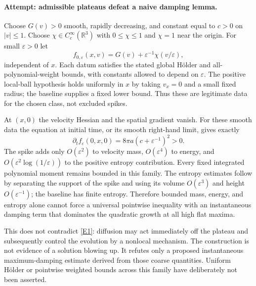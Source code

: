 \documentclass[11pt,a4paper]{article}
\newcommand{\R}{\mathbb{R}}
\newcommand{\eps}{\varepsilon}
\newcommand{\eref}[2]{\hyperlink{extra:#1:#2}{[E#2]}}
\numberwithin{equation}{section}
\begin{document}
\paragraph{Attempt: admissible plateaus defeat a naive damping lemma.}
Choose $G(v)>0$ smooth, rapidly decreasing, and constant equal to $c>0$
on $|v|\le1$. Choose $\chi\in C_c^\infty(\R^3)$ with
$0\le\chi\le1$ and $\chi=1$ near the origin. For small $\eps>0$ let
\begin{equation}\label{eq179-spike}
 f_{0,\eps}(x,v)=G(v)+\eps^{-1}\chi(v/\eps),
\end{equation}
independent of $x$. Each datum satisfies the stated global H\"older and
all-polynomial-weight bounds, with constants allowed to depend on $\eps$.
The positive local-ball hypothesis holds uniformly in $x$ by taking
$v_x=0$ and a small fixed radius; the baseline supplies a fixed lower bound.
Thus these are legitimate data for the chosen class, not excluded spikes.

At $(x,0)$ the velocity Hessian and the spatial gradient vanish. For these
smooth data the equation at initial time, or its smooth right-hand limit,
gives exactly
\begin{equation}\label{eq179-positive}
       \partial_t f_{\eps}(0,x,0)
                         =8\pi a(c+\eps^{-1})^2>0.
\end{equation}
The spike adds only $O(\eps^2)$ to velocity mass, $O(\eps^4)$ to energy,
and $O(\eps^2\log(1/\eps))$ to the positive entropy contribution.
Every fixed integrated polynomial moment remains bounded in this family.
The entropy estimates follow by separating the support of the spike and
using its volume $O(\eps^3)$ and height $O(\eps^{-1})$; the baseline has
finite entropy. Therefore bounded mass, energy, and entropy alone cannot
force a universal pointwise inequality with an instantaneous damping term
that dominates the quadratic growth at all high flat maxima.

This does not contradict \eref{30006773}{1}: diffusion may act immediately off
the plateau and subsequently control the evolution by a nonlocal mechanism.
The construction is not evidence of a solution blowing up. It refutes only
a proposed instantaneous maximum-damping estimate derived from those
coarse quantities. Uniform H\"older or pointwise weighted bounds across
this family have deliberately not been asserted.
\end{document}
